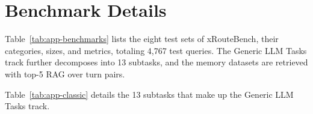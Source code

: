 
\section{Benchmark Details} \label{app:benchmarks}

Table~\ref{tab:app-benchmarks} lists the eight test sets of xRouteBench, their categories, sizes, and metrics, totaling 4{,}767 test queries. The Generic LLM Tasks track further decomposes into 13 subtasks, and the memory datasets are retrieved with top-5 RAG over turn pairs.

\begin{table}[h]
\centering
\caption{\textbf{The eight test sets of xRouteBench.} Sizes are the number of test queries; metrics are exact match (EM), multiple-choice accuracy (MC), token-level F1, execution-based code pass rate, math answer matching, and a persona-conditioned LLM judge.}
\label{tab:app-benchmarks}
\small
{}
\end{table}

Table~\ref{tab:app-classic} details the 13 subtasks that make up the Generic LLM Tasks track.

